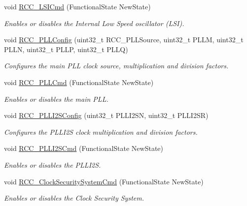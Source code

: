 \begin{DoxyCompactItemize}
void \hyperlink{group___r_c_c___group1_ga81e3ca29fd154ac2019bba6936d6d5ed}{R\+C\+C\+\_\+\+L\+S\+I\+Cmd} (Functional\+State New\+State)
\begin{DoxyCompactList}\small\item\em Enables or disables the Internal Low Speed oscillator (L\+SI). \end{DoxyCompactList}\item 
void \hyperlink{group___r_c_c___group1_ga154b93e90bfdede2a874244a1ff1002e}{R\+C\+C\+\_\+\+P\+L\+L\+Config} (uint32\+\_\+t R\+C\+C\+\_\+\+P\+L\+L\+Source, uint32\+\_\+t P\+L\+LM, uint32\+\_\+t P\+L\+LN, uint32\+\_\+t P\+L\+LP, uint32\+\_\+t P\+L\+LQ)
\begin{DoxyCompactList}\small\item\em Configures the main P\+LL clock source, multiplication and division factors. \end{DoxyCompactList}\item 
void \hyperlink{group___r_c_c___group1_ga84dee53c75e58fdb53571716593c2272}{R\+C\+C\+\_\+\+P\+L\+L\+Cmd} (Functional\+State New\+State)
\begin{DoxyCompactList}\small\item\em Enables or disables the main P\+LL. \end{DoxyCompactList}\item 
void \hyperlink{group___r_c_c___group1_ga4c15157382939a693c15620a4867e6ad}{R\+C\+C\+\_\+\+P\+L\+L\+I2\+S\+Config} (uint32\+\_\+t P\+L\+L\+I2\+SN, uint32\+\_\+t P\+L\+L\+I2\+SR)
\begin{DoxyCompactList}\small\item\em Configures the P\+L\+L\+I2S clock multiplication and division factors. \end{DoxyCompactList}\item 
void \hyperlink{group___r_c_c___group1_ga2efe493a6337d5e0034bfcdfb0f541e4}{R\+C\+C\+\_\+\+P\+L\+L\+I2\+S\+Cmd} (Functional\+State New\+State)
\begin{DoxyCompactList}\small\item\em Enables or disables the P\+L\+L\+I2S. \end{DoxyCompactList}\item 
void \hyperlink{group___r_c_c___group1_ga0ff1fd7b9a8a49cdda11b7d7261c3494}{R\+C\+C\+\_\+\+Clock\+Security\+System\+Cmd} (Functional\+State New\+State)
\begin{DoxyCompactList}\small\item\em Enables or disables the Clock Security System. \end{DoxyCompactList}\item 

\end{DoxyCompactItemize}
